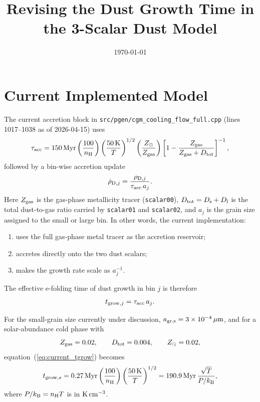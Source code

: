 \documentclass[11pt]{article}
\title{Revising the Dust Growth Time in the 3-Scalar Dust Model}
\date{\today}
\begin{document}
\maketitle

\section{Current Implemented Model}

The current accretion block in \texttt{src/pgen/cgm\_cooling\_flow\_full.cpp} (lines 1017--1038 as of 2026-04-15) uses
\begin{equation}
\tau_{\rm acc} = 150\,{\rm Myr}
\left(\frac{100}{n_{\rm H}}\right)
\left(\frac{50\,{\rm K}}{T}\right)^{1/2}
\left(\frac{Z_\odot}{Z_{\rm gas}}\right)
\left[1-\frac{Z_{\rm gas}}{Z_{\rm gas}+D_{\rm tot}}\right]^{-1},
\label{eq:current_tau}
\end{equation}
followed by a bin-wise accretion update
\begin{equation}
\dot{\rho}_{{\rm D},j} = \frac{\rho_{{\rm D},j}}{\tau_{\rm acc}\,a_j}.
\label{eq:current_rate}
\end{equation}
Here $Z_{\rm gas}$ is the gas-phase metallicity tracer (\texttt{scalar00}), $D_{\rm tot}=D_{\rm s}+D_{\rm l}$ is the total dust-to-gas ratio carried by \texttt{scalar01} and \texttt{scalar02}, and $a_j$ is the grain size assigned to the small or large bin. In other words, the current implementation:
\begin{enumerate}
\item uses the full gas-phase metal tracer as the accretion reservoir;
\item accretes directly onto the two dust scalars;
\item makes the growth rate scale as $a_j^{-1}$.
\end{enumerate}

The effective e-folding time of dust growth in bin $j$ is therefore
\begin{equation}
t_{{\rm grow},j} = \tau_{\rm acc}\,a_j.
\label{eq:current_tgrow}
\end{equation}

For the small-grain size currently under discussion, $a_{\rm gr,s}=3\times10^{-4}\,\mu{\rm m}$, and for a solar-abundance cold phase with
\begin{equation*}
Z_{\rm gas}=0.02,\qquad D_{\rm tot}=0.004,\qquad Z_\odot=0.02,
\end{equation*}
equation~(\ref{eq:current_tgrow}) becomes
\begin{equation}
t_{{\rm grow},s}
= 0.27\,{\rm Myr}
\left(\frac{100}{n_{\rm H}}\right)
\left(\frac{50\,{\rm K}}{T}\right)^{1/2}
= 190.9\,{\rm Myr}\,\frac{\sqrt{T}}{P/k_{\rm B}},
\label{eq:current_pressure_form}
\end{equation}
where $P/k_{\rm B}=n_{\rm H}T$ is in ${\rm K\,cm^{-3}}$.
\end{document}
